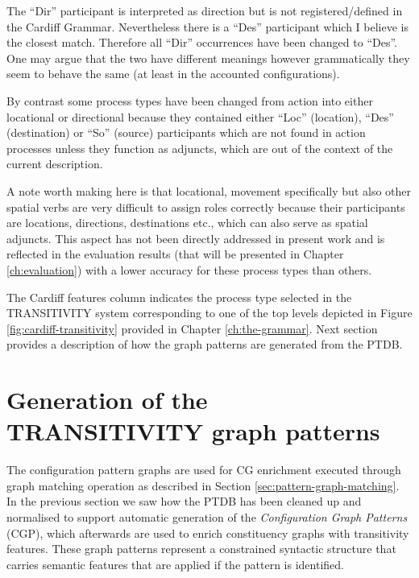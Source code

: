     The ``Dir'' participant is interpreted as direction but is not registered/defined in the Cardiff Grammar. Nevertheless there is a ``Des'' participant which I believe is the closest match. Therefore all ``Dir'' occurrences have been changed to ``Des''. One may argue that the two have different meanings however grammatically they seem to behave the same (at least in the accounted configurations). 

    By contrast some process types have been changed from action into either locational or directional because they contained either ``Loc'' (location), ``Des'' (destination) or ``So'' (source) participants which are not found in action processes unless they function as adjuncts, which are out of the context of the current description.

    A note worth making here is that locational, movement specifically but also other spatial verbs are very difficult to assign roles correctly because their participants are locations, directions, destinations etc., which can also serve as spatial adjuncts. This aspect has not been directly addressed in present work and is reflected in the evaluation results (that will be presented in Chapter \ref{ch:evaluation}) with a lower accuracy for these process types than others.

    The Cardiff features column indicates the process type selected in the TRANSITIVITY system corresponding to one of the top levels depicted in Figure \ref{fig:cardiff-transitivity} provided in Chapter \ref{ch:the-grammar}. Next section provides a description of how the graph patterns are generated from the PTDB. 

\section{Generation of the TRANSITIVITY graph patterns}
\label{sec:gen-sem}
    The configuration pattern graphs are used for CG enrichment executed through graph matching operation as described in Section \ref{sec:pattern-graph-matching}. In the previous section we saw how the PTDB has been cleaned up and normalised to support automatic generation of the \textit{Configuration Graph Patterns} (CGP), which afterwards are used to enrich constituency graphs with transitivity features. These graph patterns represent a constrained syntactic structure that carries semantic features that  are applied if the pattern is identified. 

